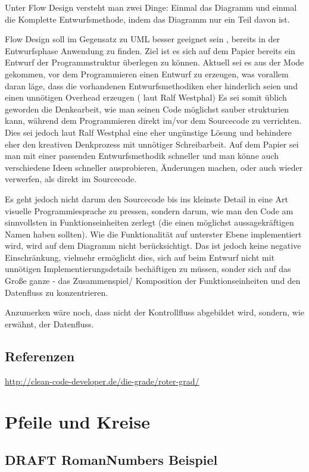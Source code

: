 \documentclass[11pt]{article}
\begin{document}
Unter Flow Design versteht man zwei Dinge:
Einmal das Diagramm und einmal die Komplette Entwurfsmethode, indem das
Diagramm nur ein Teil davon ist.

Flow Design soll im Gegensatz zu UML besser geeignet sein , bereits in der Entwurfsphase Anwendung zu finden.
Ziel ist es sich auf dem Papier bereits ein Entwurf der Programmstruktur überlegen zu können.
Aktuell sei es aus der Mode gekommen, vor dem Programmieren einen Entwurf zu erzeugen, was vorallem daran läge, dass die vorhandenen
Entwurfsmethodiken eher hinderlich seien und einen unnötigen Overhead erzeugen ( laut Ralf Westphal)
Es sei somit üblich geworden die Denkearbeit, wie man seinen Code möglichst sauber strukturien kann,
während dem Programmieren direkt im/vor dem Sourcecode zu verrichten.
Dies sei jedoch laut Ralf Westphal eine eher ungünstige Lösung und behindere eher den kreativen Denkprozess mit
unnötiger Schreibarbeit.
Auf dem Papier sei man mit einer passenden Entwurfsmethodik schneller und man könne auch verschiedene Ideen schneller
ausprobieren, Änderungen machen, oder auch wieder verwerfen, als direkt im Sourcecode.

Es geht jedoch nicht darum den Sourcecode bis ins kleinste Detail in eine Art visuelle Programmiesprache zu pressen,
sondern darum, wie man den Code am sinnvollsten in Funktionseinheiten zerlegt (die einen möglichst aussagekräftigen Namen haben sollten).
Wie die Funktionalität auf unterster Ebene implementiert wird, wird auf dem Diagramm nicht berücksichtigt.
Das ist jedoch keine negative Einschränkung, vielmehr ermöglicht dies, sich auf beim Entwurf nicht mit unnötigen Implementierungsdetails bechäftigen zu
müssen, sonder sich auf das Große ganze - das Zusammenspiel/ Komposition der Funktionseinheiten und den Datenfluss zu konzentrieren.

Anzumerken wäre noch, dass nicht der Kontrollfluss abgebildet wird, sondern, wie erwähnt, der Datenfluss.
\subsection{Referenzen}
\label{sec:orgheadline9}

\url{http://clean-code-developer.de/die-grade/roter-grad/}

\section{Pfeile und Kreise}
\label{sec:orgheadline13}
\subsection{{\bfseries\sffamily DRAFT} RomanNumbers Beispiel}
\label{sec:orgheadline11}
\end{document}
